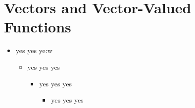 \chapter{Vectors and Vector-Valued Functions}
\begin{itemize}
  \item yes yes ye:w
  \begin{itemize}
    \item yes yes yes
      \begin{itemize}
        \item yes yes yes
          \begin{itemize}
            \item yes yes yes
          \end{itemize}
      \end{itemize}
  \end{itemize}
\end{itemize}
